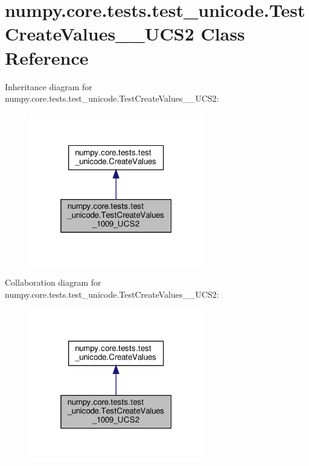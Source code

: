 \hypertarget{classnumpy_1_1core_1_1tests_1_1test__unicode_1_1TestCreateValues__1009__UCS2}{}\section{numpy.\+core.\+tests.\+test\+\_\+unicode.\+Test\+Create\+Values\+\_\+\_\+\+U\+C\+S2 Class Reference}
\label{classnumpy_1_1core_1_1tests_1_1test__unicode_1_1TestCreateValues__1009__UCS2}


Inheritance diagram for numpy.\+core.\+tests.\+test\+\_\+unicode.\+Test\+Create\+Values\+\_\+\_\+\+U\+C\+S2\+:
\nopagebreak
\begin{figure}[H]
\begin{center}
\leavevmode
\includegraphics[width=217pt]{classnumpy_1_1core_1_1tests_1_1test__unicode_1_1TestCreateValues__1009__UCS2__inherit__graph}
\end{center}
\end{figure}


Collaboration diagram for numpy.\+core.\+tests.\+test\+\_\+unicode.\+Test\+Create\+Values\+\_\+\_\+\+U\+C\+S2\+:
\nopagebreak
\begin{figure}[H]
\begin{center}
\leavevmode
\includegraphics[width=217pt]{classnumpy_1_1core_1_1tests_1_1test__unicode_1_1TestCreateValues__1009__UCS2__coll__graph}
\end{center}
\end{figure}
